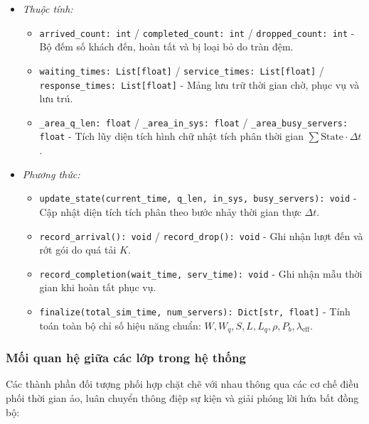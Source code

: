 \begin{itemize}[leftmargin=1.5em, itemsep=8pt]
\begin{itemize}[leftmargin=1.2em, label={}, itemsep=3pt]
\item[\textendash] \textit{Thuộc tính:}
\begin{itemize}[leftmargin=1.5em, label=+, itemsep=2pt]
\item \texttt{arrived\_count: int} / \texttt{completed\_count: int} / \texttt{dropped\_count: int} - Bộ đếm số khách đến, hoàn tất và bị loại bỏ do tràn đệm.
\item \texttt{waiting\_times: List[float]} / \texttt{service\_times: List[float]} / \texttt{response\_times: List[float]} - Mảng lưu trữ thời gian chờ, phục vụ và lưu trú.
\item \texttt{\_area\_q\_len: float} / \texttt{\_area\_in\_sys: float} / \texttt{\_area\_busy\_servers: float} - Tích lũy diện tích hình chữ nhật tích phân thời gian $\sum \text{State} \cdot \Delta t$.
\end{itemize}

\item[\textendash] \textit{Phương thức:}
\begin{itemize}[leftmargin=1.5em, label=+, itemsep=2pt]
\item \texttt{update\_state(current\_time, q\_len, in\_sys, busy\_servers): void} - Cập nhật diện tích tích phân theo bước nhảy thời gian thực $\Delta t$.
\item \texttt{record\_arrival(): void} / \texttt{record\_drop(): void} - Ghi nhận lượt đến và rớt gói do quá tải $K$.
\item \texttt{record\_completion(wait\_time, serv\_time): void} - Ghi nhận mẫu thời gian khi hoàn tất phục vụ.
\item \texttt{finalize(total\_sim\_time, num\_servers): Dict[str, float]} - Tính toán toàn bộ chỉ số hiệu năng chuẩn: $W, W_q, S, L, L_q, \rho, P_b, \lambda_{\text{eff}}$.
\end{itemize}
\end{itemize}
\end{itemize}

\subsubsection{Mối quan hệ giữa các lớp trong hệ thống}
\label{subsubsec:uml-class-relationships}

\hspace{0.5cm}Các thành phần đối tượng phối hợp chặt chẽ với nhau thông qua các cơ chế điều phối thời gian ảo, luân chuyển thông điệp sự kiện và giải phóng lời hứa bất đồng bộ:

